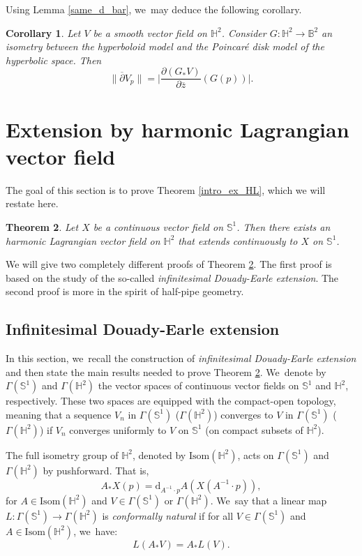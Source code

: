 \documentclass[JEP,XML,SOM,Unicode,NoEqCountersInSection, NoFloatCountersInSection,published]{cedram}
\theoremstyle{plain}
\newtheorem{cor}{Corollary}[section]
\newtheorem{theorem}[cor]{Theorem}
\theoremstyle{definition}
\begin{document}
Using Lemma \ref{same_d_bar}, we~may deduce the following corollary.
\begin{cor}\label{d_bar_isometry}
Let \(V \) be a smooth vector field on \(\mathbb{H}^2\). Consider \(G:\mathbb{H}^2 \to \mathbb{B}^2 \) an isometry between the hyperboloid model and the Poincaré disk model of the hyperbolic space. Then
\[
\lVert \overline{\partial} V_p \rVert = \bigg| \frac{\partial (G_*V)}{\partial \overline{z}}(G(p)) \bigg|.
\]
\end{cor}

\section{Extension by harmonic Lagrangian vector field}\label{sec6_extension}
The goal of this section is to prove Theorem \ref{intro_ex_HL}, which we will restate here.
\begin{theorem}\label{THHL_Existence}
Let $X$ be a continuous vector field on $\mathbb{S}^1$. Then there exists an harmonic Lagrangian vector field on $\mathbb{H}^2$ that extends continuously to $X$ on $\mathbb{S}^1$.
\end{theorem}
We will give two completely different proofs of Theorem \ref{THHL_Existence}. The first proof is based on the study of the so-called \emph{infinitesimal Douady-Earle extension}. The second proof is more in the spirit of half-pipe geometry.

\subsection{Infinitesimal Douady-Earle extension}\label{subsec_inf_DEE}
In this section, we~recall the construction of \emph{infinitesimal Douady-Earle extension} and then state the main results needed to prove Theorem \ref{THHL_Existence}. We~denote by $\Gamma(\mathbb{S}^1)$ and $\Gamma(\mathbb{H}^2)$ the vector spaces of continuous vector fields on $\mathbb{S}^1$ and $\mathbb{H}^2$, respectively. These two spaces are equipped with the compact-open topology, meaning that a sequence $V_n$ in $\Gamma(\mathbb{S}^1)$ (\resp $\Gamma(\mathbb{H}^2)$) converges to $V$ in $\Gamma(\mathbb{S}^1)$ (\resp $\Gamma(\mathbb{H}^2)$) if $V_n$ converges uniformly to $V$ on $\mathbb{S}^1$ (\resp on compact subsets of $\mathbb{H}^2$).

The full isometry group of $\mathbb{H}^2$, denoted by $\mathrm{Isom}(\mathbb{H}^2)$, acts on $\Gamma(\mathbb{S}^1)$ and $\Gamma(\mathbb{H}^2)$ by pushforward. That is,
\[
A_* X(p)=\mathrm{d}_{A^{-1}\cdot p}A(X(A^{-1}\cdot p)),
\]
for $A \in \mathrm{Isom}(\mathbb{H}^2)$ and $V \in \Gamma(\mathbb{S}^1)$ or $\Gamma(\mathbb{H}^2)$. We~say that a linear map $L:\Gamma(\mathbb{S}^1) \to \Gamma(\mathbb{H}^2)$ is \emph{conformally natural} if for all $V \in \Gamma(\mathbb{S}^1)$ and $A \in \mathrm{Isom}(\mathbb{H}^2)$, we~have:
\[
L(A_*V)=A_*L(V).
\]
\end{document}
